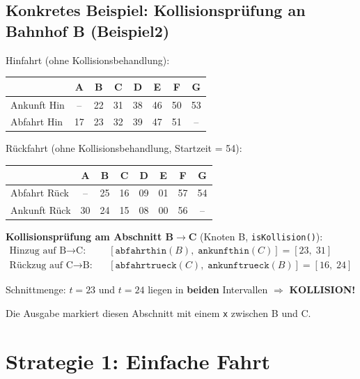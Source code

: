 \documentclass[12pt,a4paper]{article}
\begin{document}
\subsection{Konkretes Beispiel: Kollisionsprüfung an Bahnhof B (Beispiel2)}

\begin{beispielbox}[title={Beispiel2: Strecke A--B--C--D--E--F--G, Abstände: 5 8 6 7 3 2, Start: 17}]
Hinfahrt (ohne Kollisionsbehandlung):
\begin{center}
\begin{tabular}{lccccccc}
\toprule
 & A & B & C & D & E & F & G \\
\midrule
Ankunft Hin & -- & 22 & 31 & 38 & 46 & 50 & 53 \\
Abfahrt Hin & 17 & 23 & 32 & 39 & 47 & 51 & -- \\
\bottomrule
\end{tabular}
\end{center}

Rückfahrt (ohne Kollisionsbehandlung, Startzeit = 54):
\begin{center}
\begin{tabular}{lccccccc}
\toprule
 & A & B & C & D & E & F & G \\
\midrule
Abfahrt Rück & -- & 25 & 16 & 09 & 01 & 57 & 54 \\
Ankunft Rück & 30 & 24 & 15 & 08 & 00 & 56 & -- \\
\bottomrule
\end{tabular}
\end{center}

\textbf{Kollisionsprüfung am Abschnitt B$\to$C} (Knoten B, \texttt{isKollision()}):
\begin{align*}
\text{Hinzug auf B}\to\text{C:} &\quad [\texttt{abfahrthin}(B),\; \texttt{ankunfthin}(C)] = [23,\; 31] \\
\text{Rückzug auf C}\to\text{B:} &\quad [\texttt{abfahrtrueck}(C),\; \texttt{ankunftrueck}(B)] = [16,\; 24]
\end{align*}

Schnittmenge: $t = 23$ und $t = 24$ liegen in \textbf{beiden} Intervallen $\Rightarrow$ \textbf{KOLLISION!}

Die Ausgabe markiert diesen Abschnitt mit einem \texttt{x} zwischen B und C.
\end{beispielbox}

\section{Strategie 1: Einfache Fahrt}
\end{document}
